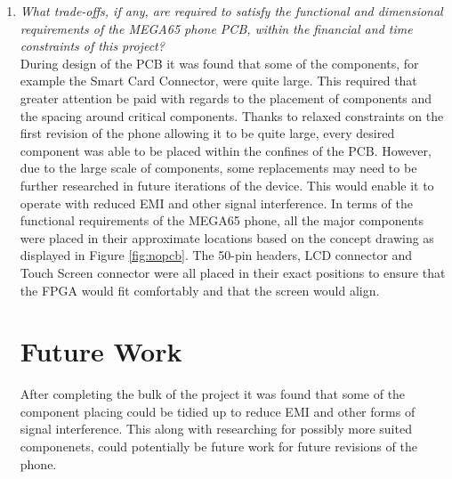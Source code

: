 \begin{enumerate}
\item \textit{What trade-offs, if any, are required to satisfy the functional and dimensional requirements of the MEGA65 phone PCB, within the financial and time constraints of this project?}\\

	During design of the PCB it was found that some of the components, for example the Smart Card Connector, were quite large. 
This required that greater attention be paid with regards to the placement of components and the spacing around critical components. 
Thanks to relaxed constraints on the first revision of the phone allowing it to be quite large, every desired component was able to be placed within the confines of the PCB. 
However, due to the large scale of components, some replacements may need to be further researched in future iterations of the device. This would enable it to operate with reduced EMI and other signal interference.
In terms of the functional requirements of the MEGA65 phone, all the major components were placed in their approximate locations based on the concept drawing as displayed in Figure \ref{fig:nopcb}. The 50-pin headers, LCD connector and Touch Screen connector were all placed in their exact positions to ensure that the FPGA would fit comfortably and that the screen would align.\\

\section{Future Work}

	After completing the bulk of the project it was found that some of the component placing could be tidied up to reduce EMI and other forms of signal interference. This along with researching for possibly more suited componenets, could potentially be future work for future revisions of the phone. 

\end{enumerate}






